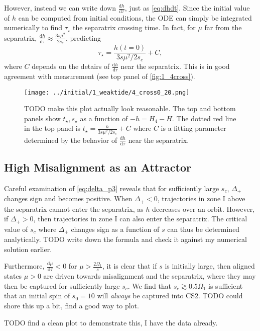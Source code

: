 \documentclass[
        fleqn,
        usenatbib,
    ]{mnras}
\newcommand*{\rd}[2]{\frac{\mathrm{d}#1}{\mathrm{d}#2}}
\begin{document}
However, instead we can write down $\rd{h}{\tau}$, just as \autoref{eq:dhdt}.
Since the initial value of $h$ can be computed from initial conditions, the ODE
can simply be integrated numerically to find $\tau_\star$ the separatrix
crossing time. In fact, for $\mu$ far from the separatrix, $\rd{h}{\tau} \approx
\frac{3s\mu^2}{2s_c}$, predicting
\begin{equation}
    \tau_\star = \frac{h(t = 0)}{3s\mu^2/2s_c} + C,
\end{equation}
where $C$ depends on the detairs of $\rd{h}{\tau}$ near the separatrix. This is
in good agreement with measurement (see top panel of \autoref{fig:1_4cross}).
\begin{figure}
    \centering
    \texttt{[image: ../initial/1\_weaktide/4\_cross0\_20.png]}
    \caption{TODO make this plot actually look reasonable. The top and bottom
    panels show $t_\star, s_\star$ as a function of $-h = H_4 - H$. The dotted
    red line in the top panel is $t_\star = \frac{h}{3s\mu^2/2s_c} + C$ where
    $C$ is a fitting parameter determined by the behavior of $\rd{h}{\tau}$ near
    the separatrix.}\label{fig:1_4cross}
\end{figure}

\subsection{High Misalignment as an Attractor}

Careful examination of \autoref{eq:delta_p3} reveals that for sufficiently large
$s_c$, $\Delta_+$ changes sign and becomes positive. When $\Delta_+ < 0$,
trajectories in zone I above the separatrix cannot enter the separatrix, as $h$
decreases over an orbit. However, if $\Delta_+ > 0$, then trajectories in zone I
can also enter the separatrix. The critical value of $s_c$ where $\Delta_+$
changes sign as a function of $s$ can thus be determined analytically. TODO
write down the formula and check it against my numerical solution earlier.

Furthermore, $\rd{\mu}{\tau} < 0$ for $\mu > \frac{2\Omega_1}{s}$, it is clear
that if $s$ is initially large, then aligned states $\mu > 0$ are driven towards
misalignment and the separatrix, where they may then be captured for
sufficiently large $s_c$. We find that $s_c \gtrsim 0.5 \Omega_1$ is sufficient
that an initial spin of $s_0 = 10$ will \emph{always} be captured into CS2. TODO
could shore this up a bit, find a good way to plot.

TODO find a clean plot to demonstrate this, I have the data already.





\label{lastpage} %
\end{document}
